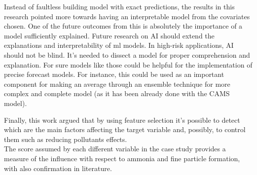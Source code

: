 Instead of faultless building model with exact predictions, the results in this research pointed more towards having an interpretable model from the covariates chosen. 
One of the future outcomes from this is absolutely the importance of a model sufficiently explained.
Future research on AI should extend the explanations and interpretability of \acrshort{ml} models.
In high-risk applications, AI should not be blind. 
It's needed to dissect a model for proper comprehension and explanation.
For sure models like those could be helpful for the implementation of precise forecast models.  
For instance, this could be used as an important component for making an average through an ensemble technique for more complex and complete model (as it has been already done with the CAMS model).
\par
Finally, this work argued that by using feature selection it's possible to detect which are the main factors affecting the target variable and, possibly, to control them such as reducing pollutants effects.\\
The score assumed by each different variable in the case study provides a measure of the influence with respect to ammonia and fine particle formation, with also confirmation in literature.
\begin{comment}
Looking forward, further attempts for reducing pollutant formation should be made by procedures actually used.
\end{comment}
